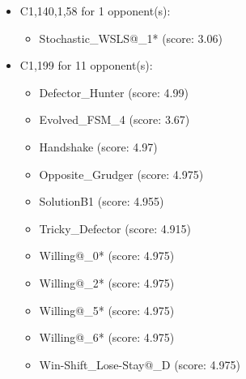 \begin{appendices}
\begin{itemize}
    \item C1,140,1,58 for 1 opponent(s):
    \begin{multicols}{3}
         \begin{itemize}
            \item Stochastic\_WSLS@\_1* (score: 3.06)
        \end{itemize}
     \end{multicols}
     
    \item C1,199 for 11 opponent(s):
    \begin{multicols}{3}
         \begin{itemize}
            \item Defector\_Hunter (score: 4.99)
            \item Evolved\_FSM\_4 (score: 3.67)
            \item Handshake (score: 4.97)
            \item Opposite\_Grudger (score: 4.975)
            \item SolutionB1 (score: 4.955)
            \item Tricky\_Defector (score: 4.915)
            \item Willing@\_0* (score: 4.975)
            \item Willing@\_2* (score: 4.975)
            \item Willing@\_5* (score: 4.975)
            \item Willing@\_6* (score: 4.975)
            \item Win-Shift\_Lose-Stay@\_D (score: 4.975)
        \end{itemize}
     \end{multicols}
     

\end{itemize}
\end{appendices}
